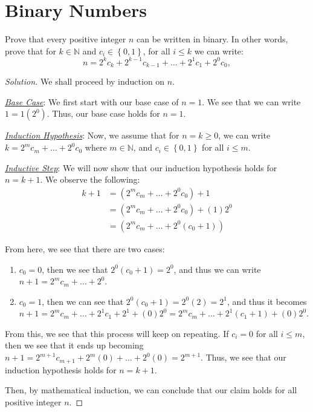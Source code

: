 \documentclass[openany]{book}
\newenvironment{solution}{\begin{proof}[Solution]}{\end{proof}}
\newcommand{\NN}{\mathbb{N}}
\begin{document}
\section{Binary Numbers}
\begin{hw}
	Prove that every positive integer $n$ can be written in binary. In other words, prove that for $k \in \NN$ and $c_{i}\in\left\{  0, 1\right\}$, for all $i \leq k$ we can write:
	\begin{equation*}
		n = 2^{k}c_{k} + 2^{k-1}c_{k-1} + \ldots + 2^{1}c_{1} + 2^{0}c_{0},
	\end{equation*}
\end{hw}
\begin{solution}
	We shall proceed by induction on $n$.
	
	\underline{\textit{Base Case}}: We first start with our base case of $n=1$. We see that we can write $1 = 1(2^{0})$. Thus, our base case holds for $n=1$.
	
	\underline{\textit{Induction Hypothesis}}: Now, we assume that for $n=k \geq 0$, we can write $k = 2^{m}c_{m} + \ldots + 2^{0}c_{0}$ where $m \in \NN$, and $c_{i} \in \left\{  0, 1\right\}$ for all $i \leq m$.
	
	\underline{\textit{Inductive Step}}: We will now show that our induction hypothesis holds for $n=k+1$. We observe the following:
	\begin{align*}
		k+1 &= \left( 2^{m}c_{m} + \ldots + 2^{0}c_{0} \right) + 1\tag{by our induction hypothesis} \\
		&= \left( 2^{m}c_{m} + \ldots + 2^{0}c_{0} \right) + (1)2^{0} \\
		&= \left( 2^{m}c_{m} + \ldots + 2^{0}(c_{0}+1) \right)
	\end{align*}

	From here, we see that there are two cases:
	\begin{enumerate}
		\item $c_{0}=0$, then we see that $2^{0}(c_{0}+1)=2^{0}$, and thus we can write $n+1 = 2^{m}c_{m} + \ldots + 2^{0}$.
		
		\item $c_{0}=1$, then we can see that $2^{0}(c_{0}+1)=2^{0}(2)=2^{1}$, and thus it becomes $n+1 = 2^{m}c_{m} + \ldots + 2^{1}c_{1} + 2^{1} + (0)2^{0} = 2^{m}c_{m} + \ldots + 2^{1}(c_{1} + 1) + (0)2^{0}$.
	\end{enumerate}

	From this, we see that this process will keep on repeating. If $c_{i} = 0$ for all $i \leq m$, then we see that it ends up becoming $n+1 = 2^{m+1}c_{m+1}+2^{m}(0)+\ldots+2^{0}(0)=2^{m+1}$. Thus, we see that our induction hypothesis holds for $n=k+1$.
	
	Then, by mathematical induction, we can conclude that our claim holds for all positive integer $n$.
\end{solution}
\end{document}
